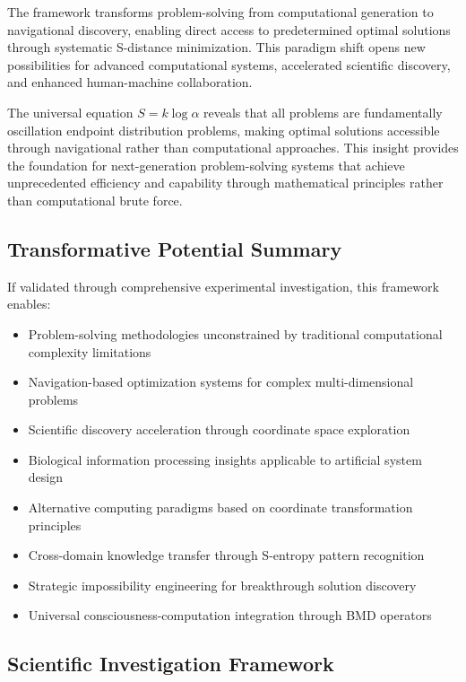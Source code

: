 \documentclass[11pt]{article}
\theoremstyle{definition}
\theoremstyle{remark}
\newcommand{\OscillationAmplitude}{\alpha}
\newcommand{\UniversalConstant}{k}
\begin{document}
The framework transforms problem-solving from computational generation to navigational discovery, enabling direct access to predetermined optimal solutions through systematic S-distance minimization. This paradigm shift opens new possibilities for advanced computational systems, accelerated scientific discovery, and enhanced human-machine collaboration.

The universal equation $S = \UniversalConstant \log \OscillationAmplitude$ reveals that all problems are fundamentally oscillation endpoint distribution problems, making optimal solutions accessible through navigational rather than computational approaches. This insight provides the foundation for next-generation problem-solving systems that achieve unprecedented efficiency and capability through mathematical principles rather than computational brute force.

\subsection{Transformative Potential Summary}

If validated through comprehensive experimental investigation, this framework enables:

\begin{itemize}
\item Problem-solving methodologies unconstrained by traditional computational complexity limitations
\item Navigation-based optimization systems for complex multi-dimensional problems
\item Scientific discovery acceleration through coordinate space exploration
\item Biological information processing insights applicable to artificial system design
\item Alternative computing paradigms based on coordinate transformation principles
\item Cross-domain knowledge transfer through S-entropy pattern recognition
\item Strategic impossibility engineering for breakthrough solution discovery
\item Universal consciousness-computation integration through BMD operators
\end{itemize}

\subsection{Scientific Investigation Framework}
\end{document}
